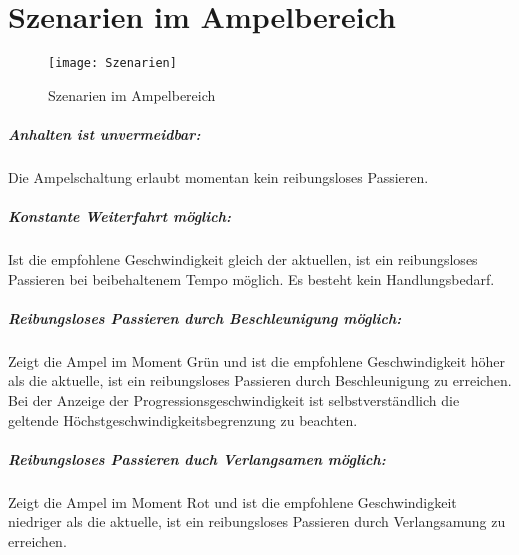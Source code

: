 \chapter{Szenarien im Ampelbereich}
\begin{figure}[H]  
    \centering  
    \texttt{[image: Szenarien]} 
    \label{fig:szenarien}
    \caption[Szenarien]{Szenarien im Ampelbereich}
\end{figure}
\paragraph{Anhalten ist unvermeidbar:} Die Ampelschaltung erlaubt momentan kein reibungsloses Passieren. 
\paragraph{Konstante Weiterfahrt möglich:} Ist die empfohlene Geschwindigkeit gleich der aktuellen, ist ein reibungsloses Passieren bei beibehaltenem Tempo möglich. Es besteht kein Handlungsbedarf. 
\paragraph{Reibungsloses Passieren durch Beschleunigung möglich:} Zeigt die Ampel im Moment Grün und ist die empfohlene Geschwindigkeit höher als die aktuelle, ist ein reibungsloses Passieren durch Beschleunigung zu erreichen. Bei der Anzeige der Progressionsgeschwindigkeit ist selbstverständlich die geltende Höchstgeschwindigkeitsbegrenzung zu beachten. 
\paragraph{Reibungsloses Passieren duch Verlangsamen möglich:} Zeigt die Ampel im Moment Rot und ist die empfohlene Geschwindigkeit niedriger als die aktuelle, ist ein reibungsloses Passieren durch Verlangsamung zu erreichen.
